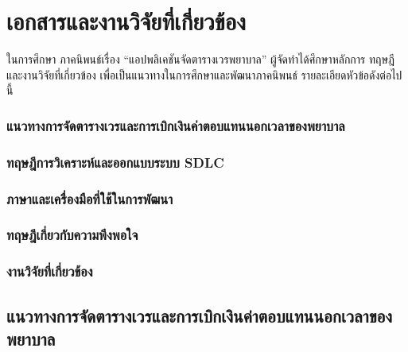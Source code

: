 
\baselineskip=8mm
\chapter{เอกสารและงานวิจัยที่เกี่ยวข้อง}

\renewcommand{\thesubsection}{\arabic{subsection}.}
\renewcommand{\theequation}{\thesection.\arabic{equation}}
\renewcommand{\thesection}{}



ในการศึกษา ภาคนิพนธ์เรื่อง “แอปพลิเคชันจัดตารางเวรพยาบาล” ผู้จัดทำได้ศึกษาหลักการ ทฤษฎี และงานวิจัยที่เกี่ยวข้อง เพื่อเป็นแนวทางในการศึกษาและพัฒนาภาคนิพนธ์ รายละเอียดหัวข้อดังต่อไปนี้

\hspace{0cm}\subsection{แนวทางการจัดตารางเวรและการเบิกเงินค่าตอบแทนนอกเวลาของพยาบาล}

\hspace{0cm}\subsection{ทฤษฎีการวิเคราะห์และออกแบบระบบ SDLC}

\hspace{0cm}\subsection{ภาษาและเครื่องมือที่ใช้ในการพัฒนา}

\hspace{0cm}\subsection{ทฤษฎีเกี่ยวกับความพึงพอใจ}

\hspace{0cm}\subsection{งานวิจัยที่เกี่ยวข้อง}

\clearpage

\section{แนวทางการจัดตารางเวรและการเบิกเงินค่าตอบแทนนอกเวลาของพยาบาล}

